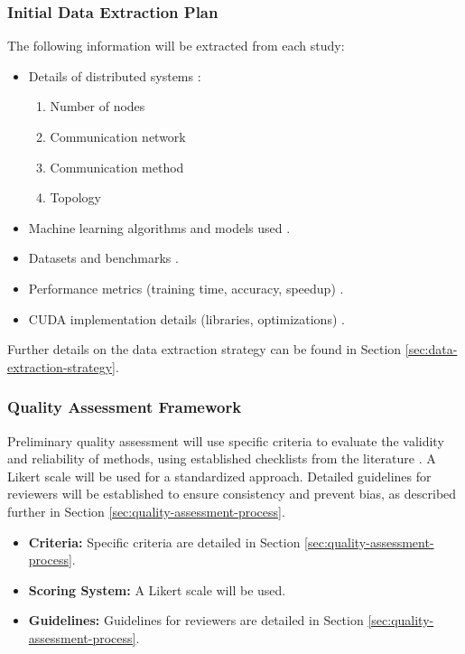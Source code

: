 \subsubsection{Initial Data Extraction Plan}
The following information will be extracted from each study:
\begin{itemize}
	\item Details of distributed systems \cite{ben-nun_demystifying_2020,langer_distributed_2020}:
	      \begin{enumerate}
		      \item Number of nodes
		      \item Communication network
		      \item Communication method
		      \item Topology
	      \end{enumerate}
	\item Machine learning algorithms and models used \cite{xing_strategies_2015}.
	\item Datasets and benchmarks \cite{ben-nun_demystifying_2020}.
	\item Performance metrics (training time, accuracy, speedup)
	      \cite{ben-nun_demystifying_2020,langer_distributed_2020,xing_strategies_2015}.
	\item CUDA implementation details (libraries, optimizations)
	      \cite{verbraeken_survey_2021,ben-nun_demystifying_2020,xing_strategies_2015}.
\end{itemize}
Further details on the data extraction strategy can be found in Section \ref{sec:data-extraction-strategy}.

\subsubsection{Quality Assessment Framework}
Preliminary quality assessment will use specific criteria to evaluate the validity and reliability
of methods, using established checklists from the literature \cite{ben-nun_demystifying_2020}. A
Likert scale will be used for a standardized approach. Detailed guidelines for reviewers will be
established to ensure consistency and prevent bias, as described further in Section
\ref{sec:quality-assessment-process}.
\begin{itemize}
	\item \textbf{Criteria:} Specific criteria are detailed in Section \ref{sec:quality-assessment-process}.
	\item \textbf{Scoring System:} A Likert scale will be used.
	\item \textbf{Guidelines:} Guidelines for reviewers are detailed in Section \ref{sec:quality-assessment-process}.
\end{itemize}

